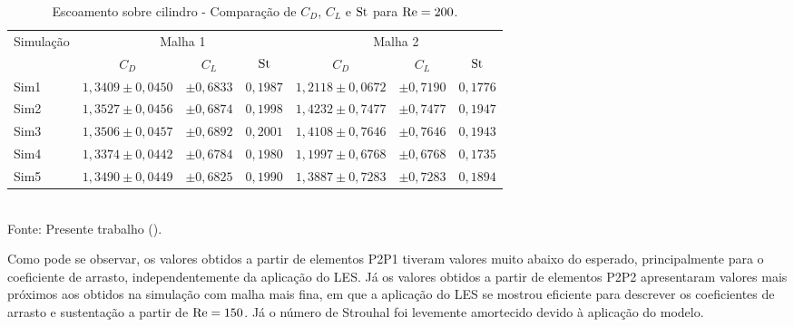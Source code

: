 \begin{table}[h!]
    \centering
    \caption{Escoamento sobre cilindro - Comparação de $C_D$, $C_L$ e $\mathrm{St}$ para $\mathrm{Re}=200$.}
    \begin{tabular}{lcccccc}
        \hline
        \multirow{2}{*}{Simulação} & \multicolumn{3}{c}{Malha 1} & \multicolumn{3}{c}{Malha 2}                                                         \\\cline{2-7}
                                   & $C_D$                       & $C_L$                       & $\mathrm{St}$   & $C_D$             & $C_L$       & $\mathrm{St}$   \\\hline
        Sim1                       & $1,3409\pm0,0450$           & $\pm0,6833$                 & $0,1987$ & $1,2118\pm0,0672$ & $\pm0,7190$ & $0,1776$ \\
        Sim2                       & $1,3527\pm0,0456$           & $\pm0,6874$                 & $0,1998$ & $1,4232\pm0,7477$ & $\pm0,7477$ & $0,1947$ \\
        Sim3                       & $1,3506\pm0,0457$           & $\pm0,6892$                 & $0,2001$ & $1,4108\pm0,7646$ & $\pm0,7646$ & $0,1943$ \\
        Sim4                       & $1,3374\pm0,0442$           & $\pm0,6784$                 & $0,1980$ & $1,1997\pm0,6768$ & $\pm0,6768$ & $0,1735$ \\
        Sim5                       & $1,3490\pm0,0449$           & $\pm0,6825$                 & $0,1990$ & $1,3887\pm0,7283$ & $\pm0,7283$ & $0,1894$ \\\hline
    \end{tabular}
    \\Fonte: Presente trabalho (\the\year).
    \label{tab:cyl-comp200}
\end{table}

Como pode se observar, os valores obtidos a partir de elementos P2P1 tiveram valores muito abaixo do esperado, principalmente para o coeficiente de arrasto, independentemente da aplicação do LES. Já os valores obtidos a partir de elementos P2P2 apresentaram valores mais próximos aos obtidos na simulação com malha mais fina, em que a aplicação do LES se mostrou eficiente para descrever os coeficientes de arrasto e sustentação a partir de $\mathrm{Re}=150$. Já o número de Strouhal foi levemente amortecido devido à aplicação do modelo.


